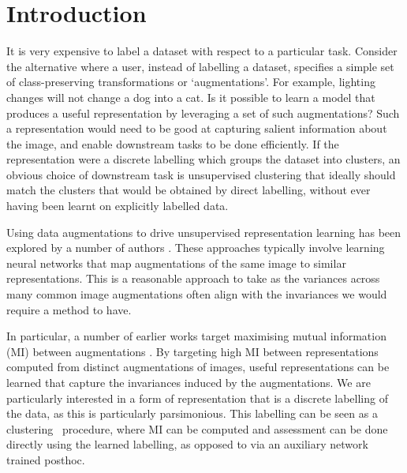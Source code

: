 \documentclass[runningheads]{llncs}
\begin{document}
\section{Introduction}\label{sec:introduction}



It is very expensive to label a dataset with respect to a particular task. Consider the alternative where a user, instead of labelling a dataset, specifies a simple set of class-preserving transformations or `augmentations'. For example, lighting changes will not change a dog into a cat. Is it possible to learn a model that produces a useful representation by leveraging a set of such augmentations? Such a representation would need to be good at capturing salient information about the image, and enable downstream tasks to be done efficiently. If the representation were a discrete labelling which groups the dataset into clusters, an obvious choice of downstream task is unsupervised clustering that ideally should match the clusters that would be obtained by direct labelling, without ever having been learnt on explicitly labelled data. 







Using data augmentations to drive unsupervised representation learning has been explored by a number of authors \cite{dosovitskiy2014discriminative, dosovitskiy2015discriminative, bachman2019learning, chang2017deep, wu2019deep, ji2019invariant, cubuk2019randaugment}. These approaches typically involve learning neural networks that map augmentations of the same image to similar representations. This is a reasonable approach to take as the variances across many common image augmentations often align with the invariances we would require a method to have.

In particular, a number of earlier works target maximising mutual information (MI) between augmentations \cite{oord2018representation, hjelm2018learning, wu2019deep, ji2019invariant, bachman2019learning}. By targeting high MI between representations computed from distinct augmentations of images, useful representations can be learned that capture the invariances induced by the augmentations. We are particularly interested in a form of representation that is a discrete labelling of the data, as this is particularly parsimonious. This labelling can be seen as a clustering~\cite{ji2019invariant} procedure, where MI can be computed and assessment can be done directly using the learned labelling, as opposed to via an auxiliary network trained posthoc.
\end{document}
